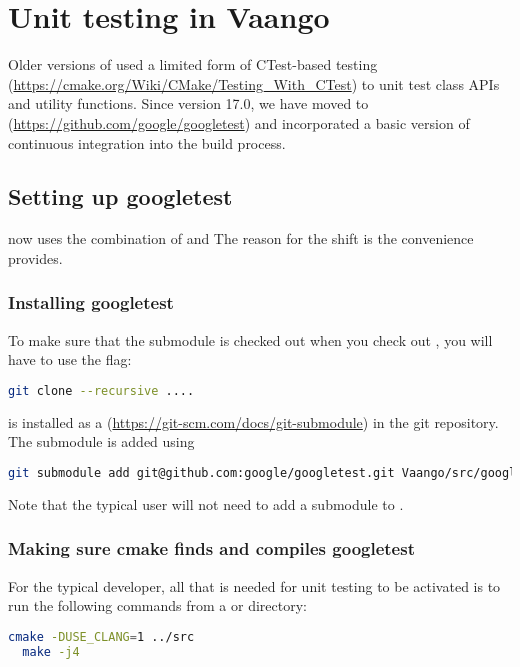 \chapter{Unit testing in Vaango}
Older versions of \Vaango used a limited form of CTest-based testing 
(\url{https://cmake.org/Wiki/CMake/Testing_With_CTest}) to unit test class  APIs
and utility functions.  Since version 17.0, we have moved to 
(\url{https://github.com/google/googletest}) and incorporated a basic version of
continuous integration into the \Vaango build process.

\section{Setting up googletest}
\Vaango now uses the combination of  and 
The reason for the shift is the convenience  provides.

\subsection{Installing googletest}
\begin{NoteBox}
To make sure that the  submodule is checked out when you check
out , you will have to use the  flag:
\begin{lstlisting}[language=sh, backgroundcolor=\color{background}]
git clone --recursive ....
\end{lstlisting}
\end{NoteBox}

 is installed as a 
(\url{https://git-scm.com/docs/git-submodule})
in the \Vaango git repository.  The submodule is added using
\begin{lstlisting}[language=sh, backgroundcolor=\color{background}]
git submodule add git@github.com:google/googletest.git Vaango/src/googletest
\end{lstlisting}
Note that the typical user will not need to add a submodule to \Vaango.

\subsection{Making sure cmake finds and compiles googletest}
\begin{NoteBox}
For the typical developer, all that is needed for unit testing to be activated is
to run the following commands from a  or  directory:
\begin{lstlisting}[language=sh, backgroundcolor=\color{background}]
  cmake -DUSE_CLANG=1 ../src
  make -j4
\end{lstlisting}
\end{NoteBox}

